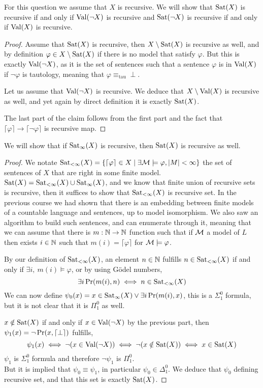 For this question we assume that $X$ is recursive.
\subquestion{}
We will show that $\operatorname{Sat}(X)$ is recursive if and only if $\operatorname{Val}(\lnot X)$ is recursive and $\operatorname{Sat}(\lnot X)$ is recursive if and only if $\operatorname{Val}(X)$ is recursive.
\begin{proof}
	Assume that $\operatorname{Sat}(X)$ is recursive, then $X \setminus \operatorname{Sat}(X)$ is recursive as well, and by definition $\varphi \in X \setminus \operatorname{Sat}(X)$ if there is no model that satisfy $\varphi$.
	But this is exactly $\operatorname{Val}(\lnot X)$, as it is the set of sentences such that a sentence $\varphi$ is in $\operatorname{Val}(X)$ if $\lnot \varphi$ is tautology, meaning that $\varphi \equiv_{\operatorname{tau}} \perp$.

	Let us assume that $\operatorname{Val}(\lnot X)$ is recursive.
	We deduce that $X \setminus \operatorname{Val}(X)$ is recursive as well, and yet again by direct definition it is exactly $\operatorname{Sat}(X)$.

	The last part of the claim follows from the first part and the fact that $\lceil \varphi \rceil \to \lceil \lnot \varphi \rceil$ is recursive map.
\end{proof}

\subquestion{}
We will show that if $\operatorname{Sat}_{\infty}(X)$ is recursive, then $\operatorname{Sat}(X)$ is recursive as well.
\begin{proof}
	We notate $\operatorname{Sat}_{< \infty}(X) = \{ \lceil \varphi \rceil \in X \mid \exists \mathcal{M} \models \varphi, |M| < \infty \}$ the set of sentences of $X$ that are right in some finite model.
	$\operatorname{Sat}(X) = \operatorname{Sat}_{< \infty}(X) \cup \operatorname{Sat}_{\infty}(X)$, and we know that finite union of recursive sets is recursive, then it suffices to show that $\operatorname{Sat}_{< \infty}(X)$ is recursive set.
	In the previous course we had shown that there is an embedding between finite models of a countable language and sentences, up to model isomorphism.
	We also saw an algorithm to build such sentences, and can enumerate through it,
	meaning that we can assume that there is $m : \mathbb{N} \to \mathbb{N}$ function such that if $\mathcal{M}$ a model of $L$ then exists $i \in \mathbb{N}$ such that $m(i) = \lceil \varphi \rceil$ for $\mathcal{M} \models \varphi$.

	By our definition of $\operatorname{Sat}_{< \infty}(X)$, an element $n \in \mathbb{N}$ fulfills $n \in \operatorname{Sat}_{< \infty}(X)$ if and only if $\exists i,\ m(i) \models \varphi$, or by using Gödel numbers,
	\[
		\exists i \operatorname{Pr}(m(i), n)
		\iff n \in \operatorname{Sat}_{< \infty}(X)
	\]
	We can now define $\psi_0(x) = x \in \operatorname{Sat}_{\infty}(X) \lor \exists i \operatorname{Pr}(m(i), x)$, this is a $\Sigma_1^0$ formula, but it is not clear that it is $\Pi_1^0$ as well.

	$x \notin \operatorname{Sat}(X)$ if and only if $x \in \operatorname{Val}(\lnot X)$ by the previous part, then $\psi_1(x) = \lnot \operatorname{Pr}(x, \lceil \perp \rceil)$ fulfills,
	\[
		\psi_1(x)
		\iff \lnot (x \in \operatorname{Val}(\lnot X))
		\iff \lnot (x \notin \operatorname{Sat}(X))
		\iff x \in \operatorname{Sat}(X)
	\]
	$\psi_1$ is $\Sigma_1^0$ formula and therefore $\lnot \psi_1$ is $\Pi_1^0$. \\
	But it is implied that $\psi_0 \equiv \psi_1$, in particular $\psi_0 \in \Delta_1^0$.
	We deduce that $\psi_0$ defining recursive set, and that this set is exactly $\operatorname{Sat}(X)$.
\end{proof}


